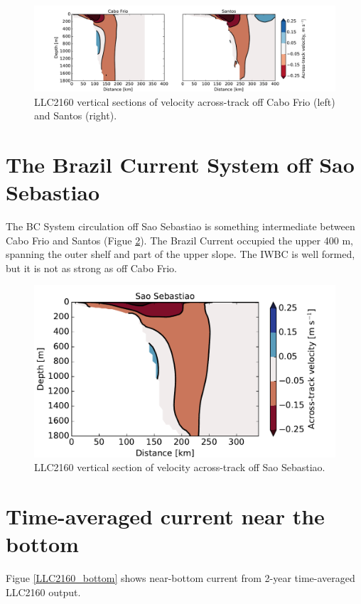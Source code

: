 \documentclass[11pt]{article}
\begin{document}
\begin{figure}[!ht]
  \centering
      \includegraphics[width=1.05\textwidth]{figs/LLC2160_VelSections.pdf}
  \caption{LLC2160 vertical sections of velocity across-track off Cabo Frio (left)
          and Santos (right).}
          \label{LLC2160Sec}
\end{figure}


\section{The Brazil Current System off Sao Sebastiao}
The BC System circulation off Sao Sebastiao is something
intermediate between Cabo Frio and Santos (Figue \ref{LLC2160_SaoSeba}).
The Brazil Current occupied the upper 400 m, spanning the outer shelf and
part of the upper slope. The IWBC is well formed, but it is not as strong as off Cabo Frio.


\begin{figure}[!ht]
  \centering
      \includegraphics[width=.6\textwidth]{figs/LLC2160_VelSection_SaoSeba.pdf}
  \caption{LLC2160 vertical section of velocity across-track off Sao Sebastiao.}
          \label{LLC2160_SaoSeba}
\end{figure}

\section{Time-averaged current near the bottom}
Figue \ref{LLC2160_bottom} shows near-bottom current from 2-year time-averaged
LLC2160 output.
\end{document}

